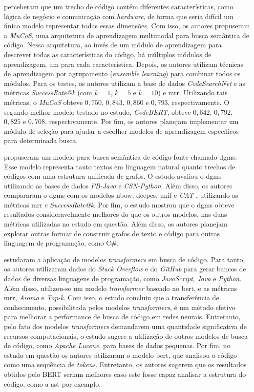 \textcite{Du2021IsAS} perceberam que um trecho de código contém diferentes características, como lógica de negócio e comunicação com \textit{hardware}, de forma que seria difícil um único modelo representar todas essas dimensões. Com isso, os autores propuseram a \textit{MuCoS}, uma arquitetura de aprendizagem multimodal para busca semântica de código. Nessa arquitetura, ao invés de um módulo de aprendizagem para descrever todas as características do código, há múltiplos módulos de aprendizagem, um para cada característica. Depois, os autores utilizam técnicas de aprendizagem por agrupamento (\textit{ensemble learning}) para combinar todos os módulos. Para os testes, os autores utilizam a base de dados \textit{CodeSearchNet} \cite{Husain2019CodeSearchNetCE} e as métricas \textit{SuccessRate@k} (com $k=1$, $k=5$ e $k=10$) e \gls{mrr}. Utilizando tais métricas, o \textit{MuCoS} obteve $0,750$, $0,843$, $0,860$ e $0,793$, respectivamente. O segundo melhor modelo testado no estudo, \textit{CodeBERT}, obteve $0,642$, $0,792$, $0,825$ e $0,708$, respectivamente. Por fim, os autores planejam implementar um módulo de seleção para ajudar a escolher modelos de aprendizagem específicos para determinada busca.

\textcite{Ling2021DeepGM} propuseram um modelo para busca semântica de código-fonte chamado \gls{dgms}. Esse modelo representa tanto textos em linguagem natural quanto trechos de códigos com uma estrutura unificada de grafos. O estudo avaliou o \gls{dgms} utilizando as bases de dados \textit{FB-Java} e \textit{CSN-Python}. Além disso, os autores compararam o \gls{dgms} com os modelos \gls{nbow}, \gls{deepcs}, \gls{unif} e \textit{CAT} \cite{Haldar2020AMA}, utilizando as métricas \gls{mrr} e \textit{SuccessRate@k}. Por fim, o estudo mostrou que o \gls{dgms} obteve resultados consideravelmente melhores do que os outros modelos, nas duas métricas utilizadas no estudo em questão. Além disso, os autores planejam explorar outras formar de construir grafos de texto e código para outras linguagem de programação, como C\#.

\textcite{Salza2021OnTE} estudaram a aplicação de modelos \textit{transformers} em busca de código. Para tanto, os autores utilizaram dados do \textit{Stack Overflow} e do \textit{GitHub} para gerar bancos de dados de diversas linguagens de programação, como \textit{JavaScript}, \textit{Java} e \textit{Python}. Além disso, utilizou-se um modelo \textit{transformer} baseado no \gls{bert}, e as métricas \gls{mrr}, \textit{Aroma} e \textit{Top-k}. Com isso, o estudo concluiu que a transferência de conhecimento, possibilitada pelos modelos \textit{transformers}, é um método efetivo para melhorar a performance de busca de código em redes neurais. Entretanto, pelo fato dos modelos \textit{transformers} demandarem uma quantidade significativa de recursos computacionais, o estudo sugere a utilização de outros modelos de busca de código, como \textit{Apache Lucene}, para bases de dados pequenas. Por fim, no estudo em questão os autores utilizaram o modelo \gls{bert}, que analisou o código como uma sequência de \textit{tokens}. Entretanto, os autores sugerem que os resultados obtidos pelo BERT seriam melhores caso este fosse capaz analisar a estrutura do código, como a \gls{ast} por exemplo.

